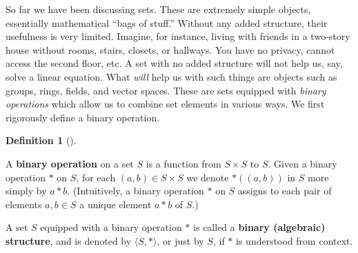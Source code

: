 \documentclass[10pt,]{book}
\newcommand{\terminology}[1]{\textbf{#1}}
\theoremstyle{plain}
\theoremstyle{definition}
\newtheorem{definition}[theorem]{Definition}
\theoremstyle{definition}
\theoremstyle{definition}
\theoremstyle{definition}
\numberwithin{equation}{section}
\begin{document}
    So far we have been discussing sets. These are extremely simple
    objects, essentially mathematical ``bags of stuff.'' Without any
    added structure, their usefulness is very limited. Imagine, for
    instance, living with friends in a two-story house without rooms,
    stairs, closets, or hallways. You have no privacy, cannot access the
    second floor, etc. A set with no added structure will not help us,
    say, solve a linear equation. What \emph{will} help us with such
    things are objects such as groups, rings, fields, and vector spaces.
    These are sets equipped with \emph{binary operations} which allow us
    to combine set elements in various ways. We first rigorously define
    a binary operation.
\begin{definition}[{}]\label{definition-14}

        A \terminology{binary operation} on a set \(S\) is a function from
        \(S\times S\) to \(S\). Given a binary operation \(*\) on \(S\), for
        each \((a,b)\in S\times S\) we denote \(*((a,b))\) in \(S\) more
        simply by \(a*b\). (Intuitively, a binary operation \(*\) on \(S\)
        assigns to each pair of elements \(a,b \in S\) a unique element
        \(a*b\) of \(S\).)
\par

        A set \(S\) equipped with a binary operation \(*\) is called a \terminology{binary (algebraic) structure}, and is denoted by \(\langle S,*\rangle\), or
        just by \(S\), if \(*\) is understood from context.
\label{notation-30}
\end{definition}
\end{document}
